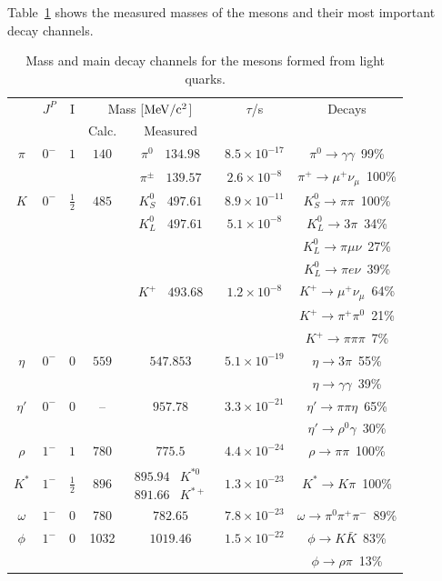 \documentclass[12pt]{article}
\begin{document}
Table~\ref{tbl:mesonDecay} shows the measured masses of the mesons and their most important decay channels. 
\begin{table}
\begin{center}
\begin{tabular}{|ccc|cc|c|c|}
\hline
 & $J^P$ & I & \multicolumn{2}{c|}{Mass [${\rm MeV/c^2}$]} & $\tau$/s & Decays\\
&&& Calc. & Measured& &\\
\hline
$\pi$ & $0^-$ & $1$ & $140$ & $\pi^0\ \ \ \ 134.98\!\!\! $   &$8.5\times10^{-17}$ & $\pi^0\to\gamma\gamma$~99\%\\
      &       &     &       & $\pi^\pm\ \ \ \ 139.57\!\!\! $ &$2.6\times10^{-8}$  & $\pi^+\to\mu^+\nu_\mu$~100\% \\
 $K$ &$0^-$ & $\frac12$ & $485$ & $K^0_S\ \ \ \ 497.61$ & $8.9\times10^{-11} $ & $K^0_S\to\pi\pi$~100\%\\
     &      &           &       & $K^0_L\ \ \ \ 497.61$   & $5.1\times10^{-8}$ & $K^0_L\to3\pi$~34\%\\
     &      &           &       &   & & $K^0_L\to\pi\mu\nu$~27\%\\
     &      &           &       &   & & $K^0_L\to\pi e\nu$~39\%\\
     &      &           &       & $K^+\ \ \ \ 493.68$ & $1.2\times10^{-8}$ & $K^+\to\mu^+\nu_\mu$~64\% \\
     &      &           &       &                     &                   & $K^+\to\pi^+\pi^0$~21\%\\
     &      &           &       &                     &                   & $K^+\to\pi\pi\pi$~7\%\\
$\eta$  &  $0^-$ &$0$& $559$ & $547.853$& $5.1\times10^{-19}$ &$\eta\to3\pi$~55\%\\
        &        &   &       &          & &$\eta\to\gamma\gamma$~39\%\\
$\eta'$ &  $0^-$ &$0$& -- & $957.78$&$3.3\times10^{-21}$& $\eta'\to\pi\pi\eta$~65\%\\
        &        &   &       &       &   & $\eta'\to\rho^0\gamma$~30\%\\
\hline
$\rho$ & $1^-$ & $1$ & $780$ & $775.5$& $4.4\times10^{-24}$ & $\rho\to\pi\pi$~100\%\\
$K^*$ &$1^-$ & $\frac12$ & $896$ & $\begin{array}{cc}895.94 & K^{*0}\\ 891.66 & K^{*+}\end{array}\!\!\!\!\!\!$ & $1.3\times10^{-23}$ & $K^*\to K\pi$~100\%\\
$\omega$ & $1^-$ & $0$ & 780 &$782.65$& $7.8\times10^{-23}$ & $\omega\to\pi^0\pi^+\pi^-$~89\%\\
$\phi$ & $1^-$ & $0$ & 1032 & $1019.46$& $1.5\times10^{-22}$ &$\phi\to K\bar{K}$~83\%\\
         &        &   &       &          && $\phi\to\rho\pi$~13\%\\
\hline
\end{tabular}
\end{center}
\caption{Mass and main decay channels for the mesons formed from light quarks.}\label{tbl:mesonDecay}
\end{table}
\end{document}
